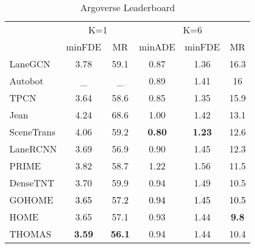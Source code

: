 \documentclass{article} \usepackage{iclr2022_conference,times}
\begin{document}
\begin{table*}[h]
\caption{Argoverse Leaderboard \citep{leaderboard}}
    \begin{center}
    \begin{tabular}{l|c c|c c c}
      \hline
       & \multicolumn{2}{c|}{K=1}  & \multicolumn{3}{c}{K=6}  \\
      & minFDE& MR&minADE & minFDE & MR \\
      \hline
      LaneGCN \citep{liang2020learning} & 3.78 & 59.1 &  0.87 & 1.36 & 16.3\\
      Autobot \citep{girgis2021autobots}  & \_ & \_ &  0.89 & 1.41  & 16\\
      TPCN \citep{ye2021tpcn}  & 3.64 & 58.6 &  0.85 & 1.35  & 15.9\\
      Jean \citep{mercat2020multi}  & 4.24 & 68.6 &  1.00 & 1.42 & 13.1\\
      SceneTrans \citep{ngiam2021scene} & 4.06 & 59.2 & \textbf{0.80} & \textbf{1.23} & 12.6 \\
      LaneRCNN \citep{zeng2021lanercnn} & 3.69 & 56.9 &  0.90 & 1.45  & 12.3\\
      PRIME  \citep{song2021learning}& 3.82 & 58.7 &  1.22 & 1.56   & 11.5\\
      DenseTNT \citep{gu2021densetnt} & 3.70 & 59.9 &  0.94 & 1.49 & 10.5\\
      GOHOME \citep{gilles2021gohome} & \textcolor{black}{3.65} & \textcolor{black}{57.2} & \textcolor{black}{0.94} & \textcolor{black}{1.45}  & \textcolor{black}{10.5}\\
      HOME \citep{gilles2021home}  & 3.65 & 57.1 &  0.93 & 1.44   & \textbf{9.8}\\
       
      \hline
      THOMAS & \textbf{3.59} & \textbf{56.1} & 0.94 & 1.44 & 10.4 \\
      
      \hline
    \end{tabular}
    \end{center}
    \label{tab:argo_test}
\end{table*}
\end{document}
